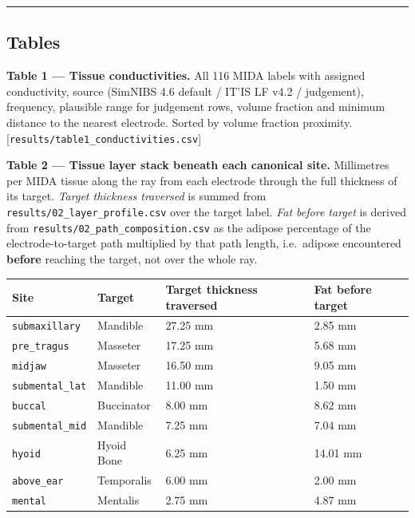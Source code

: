 \documentclass[
  11pt,
  a4paper,
]{article}
\newcounter{none} %
\begin{document}
\begin{center}\rule{0.5\linewidth}{0.5pt}\end{center}

\subsection{Tables}\label{tables}

\textbf{Table 1 --- Tissue conductivities.} All 116 MIDA labels with assigned
conductivity, source (SimNIBS 4.6 default / IT'IS LF v4.2 / judgement),
frequency, plausible range for judgement rows, volume fraction and minimum
distance to the nearest electrode. Sorted by volume fraction \texttimes{} proximity.
{[}\texttt{results/table1\_conductivities.csv}{]}

\textbf{Table 2 --- Tissue layer stack beneath each canonical site.} Millimetres per
MIDA tissue along the ray from each electrode through the full thickness of its
target. \emph{Target thickness traversed} is summed from \texttt{results/02\_layer\_profile.csv}
over the target label. \emph{Fat before target} is derived from
\texttt{results/02\_path\_composition.csv} as the adipose percentage of the
electrode-to-target path multiplied by that path length, i.e.~adipose
encountered \textbf{before} reaching the target, not over the whole ray.

{\def\LTcaptype{none} %
\begin{longtable}[]{@{}llll@{}}
\toprule\noalign{}
Site & Target & Target thickness traversed & Fat before target \\
\midrule\noalign{}
\endhead
\bottomrule\noalign{}
\endlastfoot
\texttt{submaxillary} & Mandible & 27.25 mm & 2.85 mm \\
\texttt{pre\_tragus} & Masseter & 17.25 mm & 5.68 mm \\
\texttt{midjaw} & Masseter & 16.50 mm & 9.05 mm \\
\texttt{submental\_lat} & Mandible & 11.00 mm & 1.50 mm \\
\texttt{buccal} & Buccinator & 8.00 mm & 8.62 mm \\
\texttt{submental\_mid} & Mandible & 7.25 mm & 7.04 mm \\
\texttt{hyoid} & Hyoid Bone & 6.25 mm & 14.01 mm \\
\texttt{above\_ear} & Temporalis & 6.00 mm & 2.00 mm \\
\texttt{mental} & Mentalis & 2.75 mm & 4.87 mm \\
\end{longtable}
}
\end{document}
